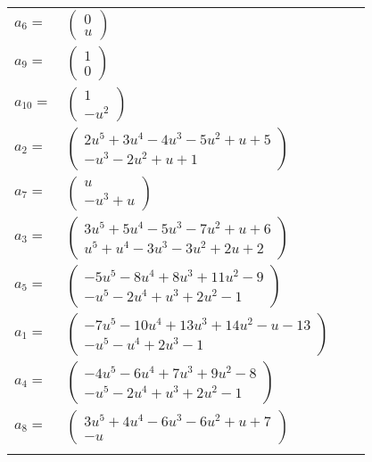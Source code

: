 \documentclass[1p]{elsarticle_modified}
\theoremstyle{definition}
\begin{document}
\begin{tabular}{m{7pt} m{180pt} m{7pt} m{180pt} }
\flushright $a_{6}=$&$\begin{pmatrix}0\\u\end{pmatrix}$ \\
\flushright $a_{9}=$&$\begin{pmatrix}1\\0\end{pmatrix}$ \\
\flushright $a_{10}=$&$\begin{pmatrix}1\\- u^2\end{pmatrix}$ \\
\flushright $a_{2}=$&$\begin{pmatrix}2 u^5+3 u^4-4 u^3-5 u^2+u+5\\- u^3-2 u^2+u+1\end{pmatrix}$ \\
\flushright $a_{7}=$&$\begin{pmatrix}u\\- u^3+u\end{pmatrix}$ \\
\flushright $a_{3}=$&$\begin{pmatrix}3 u^5+5 u^4-5 u^3-7 u^2+u+6\\u^5+u^4-3 u^3-3 u^2+2 u+2\end{pmatrix}$ \\
\flushright $a_{5}=$&$\begin{pmatrix}-5 u^5-8 u^4+8 u^3+11 u^2-9\\- u^5-2 u^4+u^3+2 u^2-1\end{pmatrix}$ \\
\flushright $a_{1}=$&$\begin{pmatrix}-7 u^5-10 u^4+13 u^3+14 u^2- u-13\\- u^5- u^4+2 u^3-1\end{pmatrix}$ \\
\flushright $a_{4}=$&$\begin{pmatrix}-4 u^5-6 u^4+7 u^3+9 u^2-8\\- u^5-2 u^4+u^3+2 u^2-1\end{pmatrix}$ \\
\flushright $a_{8}=$&$\begin{pmatrix}3 u^5+4 u^4-6 u^3-6 u^2+u+7\\- u\end{pmatrix}$\\&\end{tabular}
\end{document}
